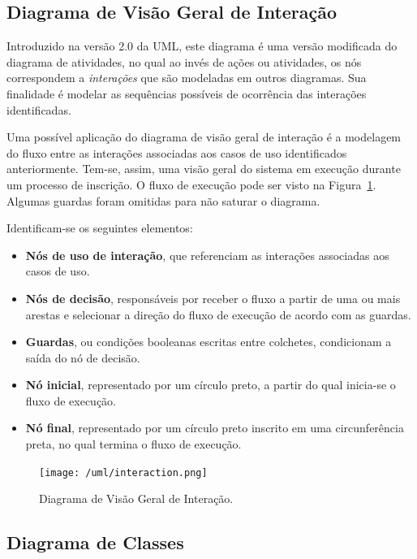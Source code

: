 \documentclass[
  10.5pt,				  %
	openright,			%
	twoside,			  %
  a5paper,
  chapter=TITLE,	%
	section=TITLE,	%
  hyphens,        %
	english,        %
	brazil          %
]{abntex2}
\begin{document}
\subsection{Diagrama de Visão Geral de Interação}

Introduzido na versão 2.0 da UML, este diagrama é uma versão modificada do diagrama de atividades, no qual ao invés de ações ou atividades, os nós correspondem a \emph{interações} que são modeladas em outros diagramas. Sua finalidade é modelar as sequências possíveis de ocorrência das interações identificadas.

Uma possível aplicação do diagrama de visão geral de interação é a modelagem do fluxo entre as interações associadas aos casos de uso identificados anteriormente. Tem-se, assim, uma visão geral do sistema em execução durante um processo de inscrição. O fluxo de execução pode ser visto na Figura~\ref{fig:interaction}. Algumas guardas foram omitidas para não saturar o diagrama.

Identificam-se os seguintes elementos:

\begin{itemize}
  \item \textbf{Nós de uso de interação}, que referenciam as interações associadas aos casos de uso.
  \item \textbf{Nós de decisão}, responsáveis por receber o fluxo a partir de uma ou mais arestas e selecionar a direção do fluxo de execução de acordo com as guardas.
  \item \textbf{Guardas}, ou condições booleanas escritas entre colchetes, condicionam a saída do nó de decisão.
  \item \textbf{Nó inicial}, representado por um círculo preto, a partir do qual inicia-se o fluxo de execução.
  \item \textbf{Nó final}, representado por um círculo preto inscrito em uma circunferência preta, no qual termina o fluxo de execução. 
\end{itemize}

\begin{figure}[!ht]
  \caption{\label{fig:interaction} Diagrama de Visão Geral de Interação.}
  \begin{center}
    \texttt{[image: /uml/interaction.png]}
  \end{center}
\end{figure}

\subsection{Diagrama de Classes}
\end{document}
